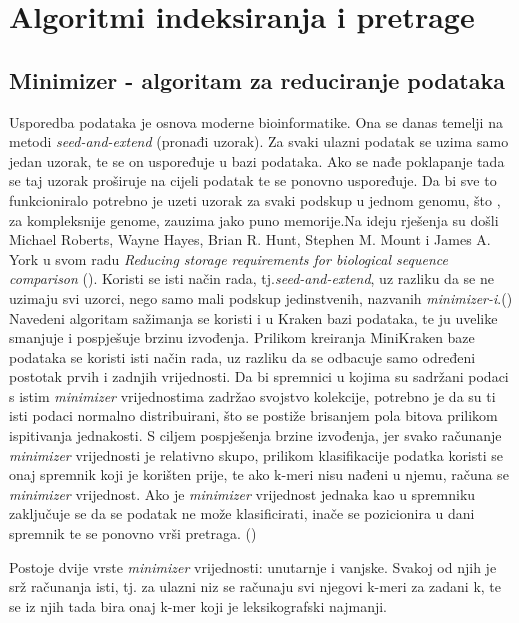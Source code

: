 \documentclass[times, utf8, zavrsni]{fer}
\begin{document}
\chapter{Algoritmi indeksiranja i pretrage}
\section{Minimizer - algoritam za reduciranje podataka}
Usporedba podataka je osnova moderne bioinformatike. Ona se danas temelji na metodi \textit{seed-and-extend} (pronađi uzorak). Za svaki ulazni podatak se uzima samo jedan uzorak, te se on uspoređuje u bazi podataka. Ako se nađe poklapanje tada se taj uzorak proširuje na cijeli podatak te se ponovno uspoređuje. Da bi sve to funkcioniralo potrebno je uzeti uzorak za svaki podskup u jednom genomu, što , za kompleksnije genome, zauzima jako puno memorije.Na ideju rješenja su došli Michael Roberts, Wayne Hayes, Brian R. Hunt, Stephen M. Mount i James A. York u svom radu \textit{Reducing storage requirements for biological sequence comparison} (\cite{minim}). Koristi se isti način rada, tj.\textit{seed-and-extend}, uz razliku da se ne uzimaju svi uzorci, nego samo mali podskup jedinstvenih, nazvanih \textit{minimizer-i}.(\cite{minim})
\\ Navedeni algoritam sažimanja se koristi i u Kraken bazi podataka, te ju uvelike smanjuje i pospješuje brzinu izvođenja. Prilikom kreiranja MiniKraken baze podataka se koristi isti način rada, uz razliku da se odbacuje samo određeni postotak prvih i zadnjih vrijednosti. Da bi spremnici u kojima su sadržani podaci s istim \textit{minimizer} vrijednostima zadržao svojstvo kolekcije, potrebno je da su ti isti podaci normalno distribuirani, što se postiže brisanjem pola bitova prilikom ispitivanja jednakosti. S ciljem pospješenja brzine izvođenja, jer svako računanje \textit{minimizer} vrijednosti je relativno skupo, prilikom klasifikacije podatka koristi se onaj spremnik koji je korišten prije, te ako k-meri nisu nađeni u njemu, računa se \textit{minimizer} vrijednost. Ako je \textit{minimizer} vrijednost jednaka kao u spremniku zaključuje se da se podatak ne može klasificirati, inače se pozicionira u dani spremnik te se ponovno vrši pretraga. (\cite{Kraken})

Postoje dvije vrste \textit{minimizer} vrijednosti: unutarnje i vanjske. Svakoj od njih je srž računanja isti, tj. za ulazni niz se računaju svi njegovi k-meri za zadani k, te se iz njih tada bira onaj k-mer koji je leksikografski najmanji. 
\end{document}

